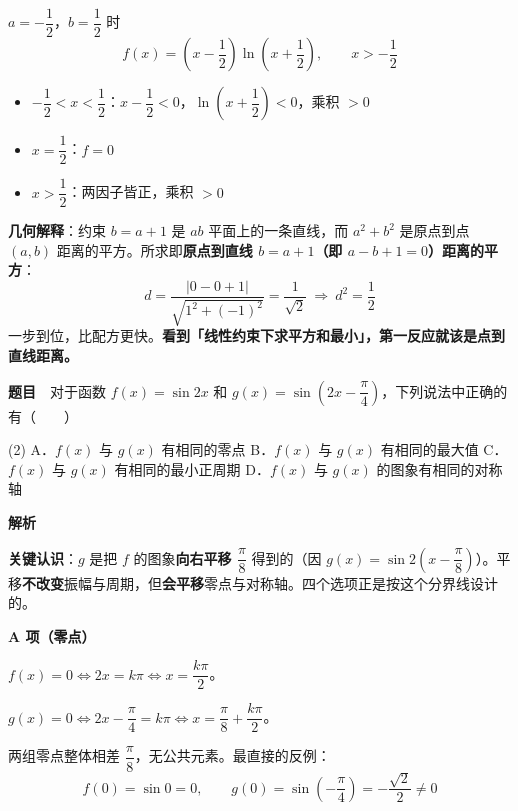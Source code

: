 $a=-\dfrac12$，$b=\dfrac12$ 时
\[f(x)=\left(x-\frac12\right)\ln\left(x+\frac12\right),\qquad x>-\frac12\]

\begin{itemize}
\item $-\dfrac12<x<\dfrac12$：$x-\dfrac12<0$，$\ln\left(x+\dfrac12\right)<0$，乘积 $>0$ 
\item $x=\dfrac12$：$f=0$ 
\item $x>\dfrac12$：两因子皆正，乘积 $>0$ 
\end{itemize}


\begin{gktip}
\textbf{几何解释}：约束 $b=a+1$ 是 $ab$ 平面上的一条直线，而 $a^{2}+b^{2}$ 是原点到点 $(a,b)$ 距离的平方。所求即\textbf{原点到直线 $b=a+1$（即 $a-b+1=0$）距离的平方}：
\[d=\frac{|0-0+1|}{\sqrt{1^{2}+(-1)^{2}}}=\frac1{\sqrt2}\ \Longrightarrow\ d^{2}=\frac12\]
一步到位，比配方更快。\textbf{看到「线性约束下求平方和最小」，第一反应就该是点到直线距离。}
\end{gktip}

\par\medskip



\textbf{题目}　对于函数 $f(x)=\sin2x$ 和 $g(x)=\sin\left(2x-\dfrac\pi4\right)$，下列说法中正确的有（　　）

\begin{gkopts}(2)
\task A．$f(x)$ 与 $g(x)$ 有相同的零点
\task B．$f(x)$ 与 $g(x)$ 有相同的最大值
\task C．$f(x)$ 与 $g(x)$ 有相同的最小正周期
\task D．$f(x)$ 与 $g(x)$ 的图象有相同的对称轴
\end{gkopts}

\textbf{解析}

\textbf{关键认识}：$g$ 是把 $f$ 的图象\textbf{向右平移 $\dfrac\pi8$} 得到的（因 $g(x)=\sin2\left(x-\dfrac\pi8\right)$）。平移\textbf{不改变}振幅与周期，但\textbf{会平移}零点与对称轴。四个选项正是按这个分界线设计的。

\par\medskip

\textbf{A 项（零点）}

$f(x)=0\iff2x=k\pi\iff x=\dfrac{k\pi}2$。

$g(x)=0\iff2x-\dfrac\pi4=k\pi\iff x=\dfrac\pi8+\dfrac{k\pi}2$。

两组零点整体相差 $\dfrac\pi8$，无公共元素。最直接的反例：
\[f(0)=\sin0=0,\qquad g(0)=\sin\left(-\frac\pi4\right)=-\frac{\sqrt2}2\ne0\]

